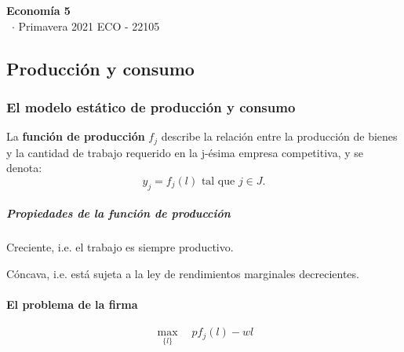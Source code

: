 \documentclass[8pt,a4paper]{extarticle}
\renewcommand{\csClass}{Economía 5}
\renewcommand{\csClassCode}{ECO - 22105}
\renewcommand{\csTerm}{Primavera 2021}
\begin{document}
\begin{titlepage}
    \begin{center}
	\vspace*{1cm}
	\Huge
        \textbf{\csClass}
	\vspace{0.5cm} \\
	\Large
        \cs\ $\cdot$ \csTerm
        \vfill
        \csAuthorName
	\vspace{0.8cm}
        \csClassCode\\
        \csSchool     
    \end{center}
\end{titlepage}

\begin{multicols}{3}
\setcounter{page}{1}

\part{Producción y consumo}

\section{El modelo estático de producción y consumo}

\begin{boxdef}
	La \textbf{función de producción} $f_j$ describe la relación entre la producción de bienes y la cantidad de trabajo requerido en la j-ésima empresa competitiva, y se denota:
	\[
		y_j = f_j(l) \text{ tal que } j \in J
	.\]
\end{boxdef}

\subsubsection*{Propiedades de la función de producción}

\begin{eqlist}
\item Creciente, i.e. el trabajo es siempre productivo.
\item Cóncava, i.e. está sujeta a la ley de rendimientos marginales decrecientes.
\end{eqlist}

\subsection{El problema de la firma}

\begin{equation*}
	\max_{\{l\}} \quad pf_j (l) - wl
\end{equation*}


\end{multicols}
\end{document}
